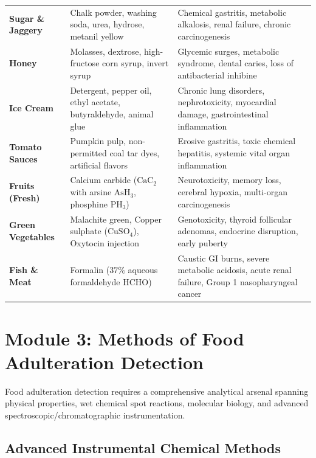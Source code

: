 \documentclass[11pt,a4paper,oneside]{article}
\begin{document}
\begin{center}
\begin{tabular}{@{}p{3.2cm} p{5.0cm} p{7.6cm}@{}}
\textbf{Sugar \& Jaggery} & Chalk powder, washing soda, urea, hydrose, metanil yellow & Chemical gastritis, metabolic alkalosis, renal failure, chronic carcinogenesis \tabularnewline
\textbf{Honey} & Molasses, dextrose, high-fructose corn syrup, invert syrup & Glycemic surges, metabolic syndrome, dental caries, loss of antibacterial inhibine \tabularnewline
\textbf{Ice Cream} & Detergent, pepper oil, ethyl acetate, butyraldehyde, animal glue & Chronic lung disorders, nephrotoxicity, myocardial damage, gastrointestinal inflammation \tabularnewline
\textbf{Tomato Sauces} & Pumpkin pulp, non-permitted coal tar dyes, artificial flavors & Erosive gastritis, toxic chemical hepatitis, systemic vital organ inflammation \tabularnewline
\textbf{Fruits (Fresh)} & Calcium carbide ($\mathrm{CaC_2}$ with arsine $\mathrm{AsH_3}$, phosphine $\mathrm{PH_3}$) & Neurotoxicity, memory loss, cerebral hypoxia, multi-organ carcinogenesis \tabularnewline
\textbf{Green Vegetables} & Malachite green, Copper sulphate ($\mathrm{CuSO_4}$), Oxytocin injection & Genotoxicity, thyroid follicular adenomas, endocrine disruption, early puberty \tabularnewline
\textbf{Fish \& Meat} & Formalin ($37\%$ aqueous formaldehyde $\mathrm{HCHO}$) & Caustic GI burns, severe metabolic acidosis, acute renal failure, Group 1 nasopharyngeal cancer \tabularnewline
\bottomrule
\end{tabular}
\end{center}

\newpage

\section{Module 3: Methods of Food Adulteration Detection}

Food adulteration detection requires a comprehensive analytical arsenal spanning physical properties, wet chemical spot reactions, molecular biology, and advanced spectroscopic/chromatographic instrumentation.

\subsection{Advanced Instrumental Chemical Methods}
\end{document}
